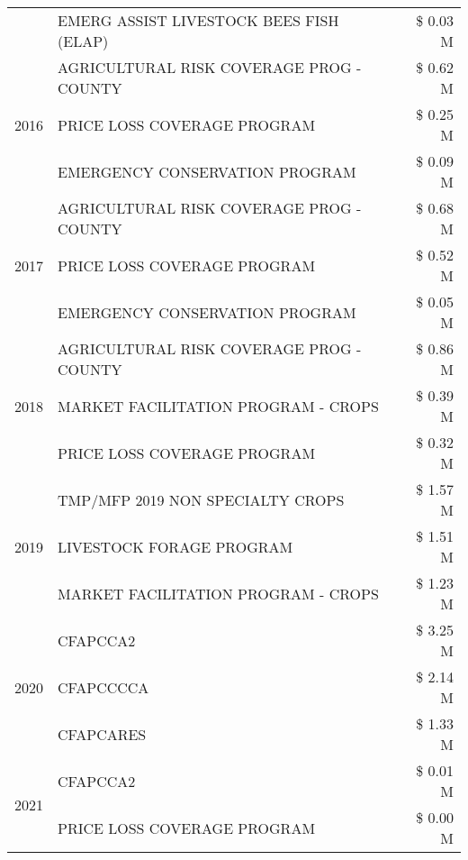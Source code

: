 \begin{tabular}{llr}
 & EMERG ASSIST LIVESTOCK BEES FISH (ELAP) & \$ 0.03 M \\
\cline{1-3}
\multirow[t]{3}{*}{2016} & AGRICULTURAL RISK COVERAGE PROG - COUNTY & \$ 0.62 M \\
 & PRICE LOSS COVERAGE PROGRAM & \$ 0.25 M \\
 & EMERGENCY CONSERVATION PROGRAM & \$ 0.09 M \\
\cline{1-3}
\multirow[t]{3}{*}{2017} & AGRICULTURAL RISK COVERAGE PROG - COUNTY & \$ 0.68 M \\
 & PRICE LOSS COVERAGE PROGRAM & \$ 0.52 M \\
 & EMERGENCY CONSERVATION PROGRAM & \$ 0.05 M \\
\cline{1-3}
\multirow[t]{3}{*}{2018} & AGRICULTURAL RISK COVERAGE PROG - COUNTY & \$ 0.86 M \\
 & MARKET FACILITATION PROGRAM - CROPS & \$ 0.39 M \\
 & PRICE LOSS COVERAGE PROGRAM & \$ 0.32 M \\
\cline{1-3}
\multirow[t]{3}{*}{2019} & TMP/MFP 2019 NON SPECIALTY CROPS & \$ 1.57 M \\
 & LIVESTOCK FORAGE PROGRAM & \$ 1.51 M \\
 & MARKET FACILITATION PROGRAM - CROPS & \$ 1.23 M \\
\cline{1-3}
\multirow[t]{3}{*}{2020} & CFAPCCA2 & \$ 3.25 M \\
 & CFAPCCCCA & \$ 2.14 M \\
 & CFAPCARES & \$ 1.33 M \\
\cline{1-3}
\multirow[t]{2}{*}{2021} & CFAPCCA2 & \$ 0.01 M \\
 & PRICE LOSS COVERAGE PROGRAM & \$ 0.00 M \\
\cline{1-3}
\bottomrule
\end{tabular}
